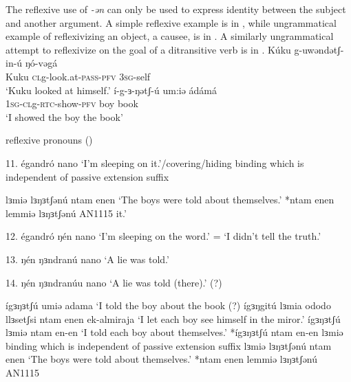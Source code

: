 The reflexive use of \textit{-ən} can only be used to express identity between the subject and another argument. A simple reflexive example is in , while ungrammatical example of reflexivizing  an object, a causee, is in . A similarly ungrammatical attempt to reflexivize on the goal of a ditransitive verb is in .
\ea 
\ea 
	\gll 	Kúku g-uwəndətʃ-in-ú	ŋó-vəgá\\
			Kuku \textsc{cl}g-look.at-\textsc{pass}-\textsc{pfv} \textsc{3sg}-self\\
	\glt 	`Kuku looked at himself.'
\z 
\ea  
	\gll 	í-g-ɜ-ŋətʃ-ú	um:iə ádámá\\
			\textsc{1sg-cl}g-\textsc{rtc}-show-\textsc{pfv} boy book\\
	\glt 	`I showed the boy the book'
\z 
\z 
	
reflexive pronouns ()

11. égandró nano	‘I’m sleeping on it.’/covering/hiding  binding which is independent of passive extension suffix

lɜmiə lɜŋɜtʃənú ntam enen				‘The boys were told about themselves.’
*ntam enen lemmiə lɜŋɜtʃənú		AN1115		
it.’

12. égandró ŋén nano	‘I’m sleeping on the word.’ = ‘I didn’t tell the truth.’

13. ŋén ŋɜndranú nano	‘A lie was told.’

14. ŋén ŋɜndranúu nano	‘A lie was told (there).’ (?)

ígɜŋɜtʃú umiə adama					‘I told the boy about the book (?)
ígɜŋgitú lɜmia ododo llɜsetʃsi ntam enen ek-almiraja	‘I let each boy see himself in the miror.’
ígɜŋɜtʃú lɜmiə ntam en-en				‘I told each boy about themselves.’
*ígɜŋɜtʃú ntam en-en lɜmiə				
 binding which is independent of passive extension suffix
lɜmiə lɜŋɜtʃənú ntam enen				‘The boys were told about themselves.’
*ntam enen lemmiə lɜŋɜtʃənú		AN1115		
 
